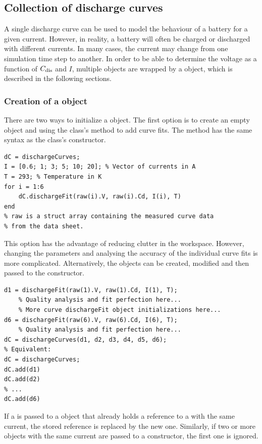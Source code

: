 \subsection{Collection of discharge curves}
\label{sec:dischargeCurves}
A single discharge curve can be used to model the behaviour of a battery for a given current. However, in reality, a battery will often be charged or discharged with different currents. In many cases, the current may change from one simulation time step to another. In order to be able to determine the voltage as a function of $C_\text{dis}$ and $I$, multiple  objects are wrapped by a  object, which is described in the following sections.

\subsubsection{Creation of a  object}
There are two ways to initialize a  object. The first option is to create an empty object and using the class's  method to add curve fits. The   method has the same syntax as the  class's constructor.
\begin{lstlisting}
dC = dischargeCurves;
I = [0.6; 1; 3; 5; 10; 20]; % Vector of currents in A
T = 293; % Temperature in K
for i = 1:6
	dC.dischargeFit(raw(i).V, raw(i).Cd, I(i), T)
end
% raw is a struct array containing the measured curve data
% from the data sheet.
\end{lstlisting}
This option has the advantage of reducing clutter in the workspace. However, changing the parameters and analysing the accuracy of the individual curve fits is more complicated.
Alternatively, the  objects can be created, modified and then passed to the  constructor.
\begin{lstlisting}
d1 = dischargeFit(raw(1).V, raw(1).Cd, I(1), T);
	% Quality analysis and fit perfection here...
	% More curve dischargeFit object initializations here...
d6 = dischargeFit(raw(6).V, raw(6).Cd, I(6), T);
	% Quality analysis and fit perfection here...
dC = dischargeCurves(d1, d2, d3, d4, d5, d6);
% Equivalent:
dC = dischargeCurves;
dC.add(d1)
dC.add(d2)
% ...
dC.add(d6)
\end{lstlisting}
If a  is passed to a  object that already holds a reference to a  with the same current, the stored reference is replaced by the new one. Similarly, if two or more  objects with the same current are passed to a  constructor, the first one is ignored.

